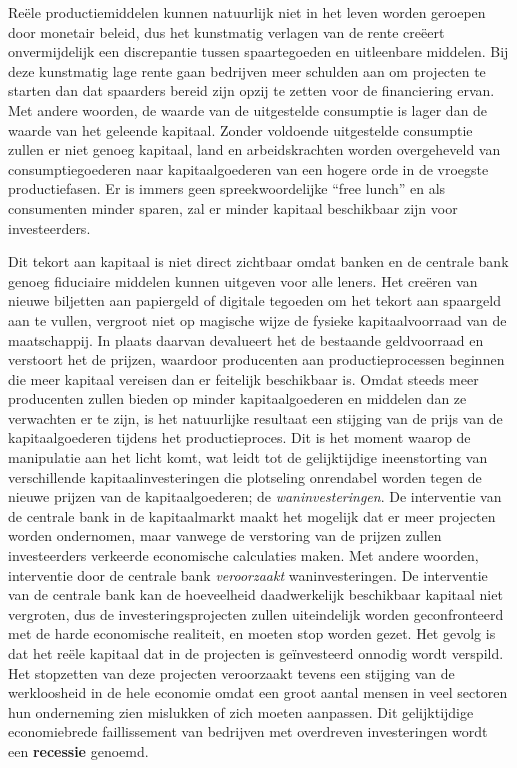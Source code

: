 Reële productiemiddelen kunnen natuurlijk niet in het leven worden geroepen door monetair beleid, dus het kunstmatig verlagen van de rente creëert onvermijdelijk een discrepantie tussen spaartegoeden en uitleenbare middelen. Bij deze kunstmatig lage rente gaan bedrijven meer schulden aan om projecten te starten dan dat spaarders bereid zijn opzij te zetten voor de financiering ervan. Met andere woorden, de waarde van de uitgestelde consumptie is lager dan de waarde van het geleende kapitaal. Zonder voldoende uitgestelde consumptie zullen er niet genoeg kapitaal, land en arbeidskrachten worden overgeheveld van consumptiegoederen naar kapitaalgoederen van een hogere orde in de vroegste productiefasen. Er is immers geen spreekwoordelijke ``free lunch'' en als consumenten minder sparen, zal er minder kapitaal beschikbaar zijn voor investeerders.

Dit tekort aan kapitaal is niet direct zichtbaar omdat banken en de centrale bank genoeg fiduciaire middelen kunnen uitgeven voor alle leners. Het creëren van nieuwe biljetten aan papiergeld of digitale tegoeden om het tekort aan spaargeld aan te vullen, vergroot niet op magische wijze de fysieke kapitaalvoorraad van de maatschappij. In plaats daarvan devalueert het de bestaande geldvoorraad en verstoort het de prijzen, waardoor producenten aan productieprocessen beginnen die meer kapitaal vereisen dan er feitelijk beschikbaar is. Omdat steeds meer producenten zullen bieden op minder kapitaalgoederen en middelen dan ze verwachten er te zijn, is het natuurlijke resultaat een stijging van de prijs van de kapitaalgoederen tijdens het productieproces. Dit is het moment waarop de manipulatie aan het licht komt, wat leidt tot de gelijktijdige ineenstorting van verschillende kapitaalinvesteringen die plotseling onrendabel worden tegen de nieuwe prijzen van de kapitaalgoederen; de \emph{waninvesteringen}. De interventie van de centrale bank in de kapitaalmarkt maakt het mogelijk dat er meer projecten worden ondernomen, maar vanwege de verstoring van de prijzen zullen investeerders verkeerde economische calculaties maken. Met andere woorden, interventie door de centrale bank \emph{veroorzaakt} waninvesteringen. De interventie van de centrale bank kan de hoeveelheid daadwerkelijk beschikbaar kapitaal niet vergroten, dus de investeringsprojecten zullen uiteindelijk worden geconfronteerd met de harde economische realiteit, en moeten stop worden gezet. Het gevolg is dat het reële kapitaal dat in de projecten is geïnvesteerd onnodig wordt verspild. Het stopzetten van deze projecten veroorzaakt tevens een stijging van de werkloosheid in de hele economie omdat een groot aantal mensen in veel sectoren hun onderneming zien mislukken of zich moeten aanpassen. Dit gelijktijdige economiebrede faillissement van bedrijven met overdreven investeringen wordt een \textbf{recessie} genoemd.

